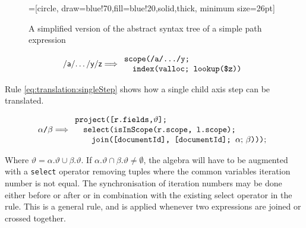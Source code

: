 \begin{figure}[h]
\centering
{}=[circle, draw=blue!70,fill=blue!20,solid,thick, minimum
size=26pt]
\label{fig:translation:pathAST}
\caption[AST of path expression]{A simplified version of the abstract syntax
tree of a simple path expression}
\end{figure}


\begin{equation}
\centering
\textsf{/a/\ldots/y/z}
\Longrightarrow
\begin{array}{l}
	\mbox{\texttt{scope(/a/\ldots/y;}} \\
	\quad \mbox{\texttt{index(valloc; lookup(\$z))}}
\end{array}
\label{eq:translation:pathExpr}
\end{equation}

Rule \ref{eq:translation:singleStep} shows how a single child axis step can be
translated.

\begin{equation}
\centering
\alpha \texttt{/} \beta
\Longrightarrow
\begin{array}{l}
	\mbox{\texttt{project([r.fields,}} \vartheta \mbox{\texttt{];}} \\ \quad
 	\mbox{\texttt{select(isInScope(r.scope, l.scope);}} \\ \quad \quad
 	\mbox{\texttt{join([documentId], [documentId]; }} 
 	\alpha;\, \beta \mbox{\texttt{)))}}; \\
\end{array}
\label{eq:translation:singleStep}
\end{equation}

Where $\vartheta = \alpha.\vartheta \cup \beta.\vartheta$. If $\alpha.\vartheta \cap \beta.\vartheta \neq
\emptyset$, the algebra will have to be augmented with a \texttt{select} operator removing tuples where the common
variables iteration number is not equal. The synchronisation of iteration numbers may be done either before or
after or in combination with the existing \textsf{select} operator in the rule. This is a general rule, and is
applied whenever two expressions are joined or crossed together.


